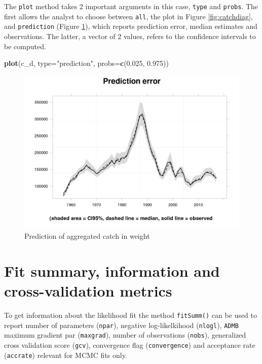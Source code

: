 \documentclass[
]{book}
\newenvironment{Shaded}{\begin{snugshade}}{\end{snugshade}}
\newcommand{\AttributeTok}[1]{\textcolor[rgb]{0.13,0.29,0.53}{#1}}
\newcommand{\FloatTok}[1]{\textcolor[rgb]{0.00,0.00,0.81}{#1}}
\newcommand{\FunctionTok}[1]{\textcolor[rgb]{0.13,0.29,0.53}{\textbf{#1}}}
\newcommand{\NormalTok}[1]{#1}
\newcommand{\StringTok}[1]{\textcolor[rgb]{0.31,0.60,0.02}{#1}}
\begin{document}
The \texttt{plot} method takes 2 important arguments in this case, \texttt{type} and \texttt{probs}. The first allows the analyst to choose between \texttt{all}, the plot in Figure \ref{fig:catchdiag}, and \texttt{prediction} (Figure \ref{fig:cpred}), which reports prediction error, median estimates and observations. The latter, a vector of 2 values, refers to the confidence intervals to be computed.

\begin{Shaded}
\begin{Highlighting}[]
\FunctionTok{plot}\NormalTok{(c\_d, }\AttributeTok{type=}\StringTok{"prediction"}\NormalTok{, }\AttributeTok{probs=}\FunctionTok{c}\NormalTok{(}\FloatTok{0.025}\NormalTok{, }\FloatTok{0.975}\NormalTok{))}
\end{Highlighting}
\end{Shaded}

\begin{figure}
\centering
\includegraphics{_bookdown_files/_main_files/figure-html/cpred-1.png}
\caption{\label{fig:cpred}Prediction of aggregated catch in weight}
\end{figure}

\hypertarget{fit-summary-information-and-cross-validation-metrics}{%
\section{Fit summary, information and cross-validation metrics}\label{fit-summary-information-and-cross-validation-metrics}}

To get information about the likelihood fit the method \texttt{fitSumm()} can be used to report number of parameters (\texttt{npar}), negative log-likelkihood (\texttt{nlogl}), \texttt{ADMB} maximum gradient par (\texttt{maxgrad}), number of observations (\texttt{nobs}), generalized cross validation score (\texttt{gcv}), convergence flag (\texttt{convergence}) and acceptance rate (\texttt{accrate}) relevant for MCMC fits only.
\end{document}
